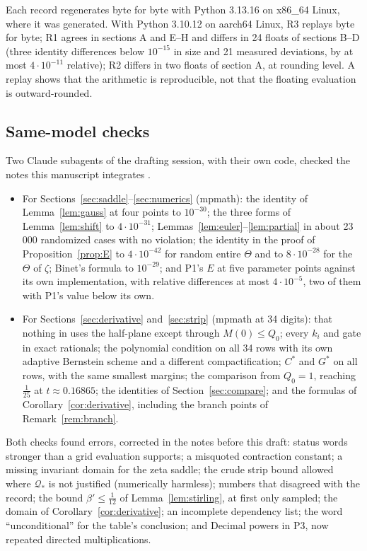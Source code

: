 \documentclass[11pt]{article}
\theoremstyle{definition}
\theoremstyle{remark}
\numberwithin{equation}{section}
\begin{document}
Each record regenerates byte for byte with Python 3.13.16 on x86\_64 Linux,
where it was generated. With Python 3.10.12 on aarch64 Linux, R3 replays
byte for byte; R1 agrees in sections A and E--H and differs in 24 floats of
sections B--D (three identity differences below $10^{-15}$ in size and 21
measured deviations, by at most $4\cdot10^{-11}$ relative); R2 differs in
two floats of section A, at rounding level. A replay shows that the
arithmetic is reproducible, not that the floating evaluation is
outward-rounded.

\subsection{Same-model checks}

Two Claude subagents of the drafting session, with their own code, checked
the notes this manuscript integrates \cite{n01,n02}.
\begin{itemize}
\item For Sections~\ref{sec:saddle}--\ref{sec:numerics} (mpmath): the
identity of Lemma~\ref{lem:gauss} at four points to $10^{-30}$; the three
forms of Lemma~\ref{lem:shift} to $4\cdot10^{-31}$;
Lemmas~\ref{lem:euler}--\ref{lem:partial} in about 23\,000 randomized cases
with no violation; the identity in the proof of Proposition~\ref{prop:E}
to $4\cdot10^{-42}$ for random entire $\Theta$ and to $8\cdot10^{-28}$ for
the $\Theta$ of $\zeta$; Binet's formula to $10^{-29}$; and P1's $E$ at five
parameter points against its own implementation, with relative differences
at most $4\cdot10^{-5}$, two of them with P1's value below its own.
\item For Sections~\ref{sec:derivative} and~\ref{sec:strip} (mpmath at 34
digits): that nothing in \cite[Lemmas~2, 3 and 10, Proposition~11 and
Theorem~12]{hb} uses the half-plane except through $M(0)\le Q_0$; every
$k_i$ and gate in exact rationals; the polynomial condition on all 34 rows
with its own adaptive Bernstein scheme and a different compactification;
$C^*$ and $G^*$ on all rows, with the same smallest margins; the
comparison from $Q_0=1$, reaching $\frac1{25}$ at $t\approx0.16865$; the
identities of Section~\ref{sec:compare}; and the formulas of
Corollary~\ref{cor:derivative}, including the branch points of
Remark~\ref{rem:branch}.
\end{itemize}
Both checks found errors, corrected in the notes before this draft: status
words stronger than a grid evaluation supports; a misquoted contraction
constant; a missing invariant domain for the zeta saddle; the crude strip
bound allowed where $\mathcal Q_*$ is not justified (numerically harmless);
numbers that disagreed with the record; the bound
$\beta'\le\frac1{12}$ of Lemma~\ref{lem:stirling}, at first only sampled;
the domain of Corollary~\ref{cor:derivative}; an incomplete dependency
list; the word ``unconditional'' for the table's conclusion; and Decimal
powers in P3, now repeated directed multiplications.
\end{document}
